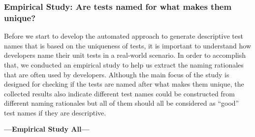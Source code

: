 \subsubsection{Empirical Study: Are tests named for what makes them unique?}
\label{sec:empStudy}

Before we start to develop the automated approach to generate descriptive test names that is based on the uniqueness of tests, it is important to understand how developers name their unit tests in a real-world scenario.
%
In order to accomplish that, we conducted an empirical study to help us extract the naming rationales that are often used by developers.
%
Although the main focus of the study is designed for checking if the tests are named after what makes them unique, the collected results also indicate different test names could be constructed from different naming rationales but all of them should all be considered as \enquote{good} test names if they are descriptive.

\textbf{---Empirical Study All---}



